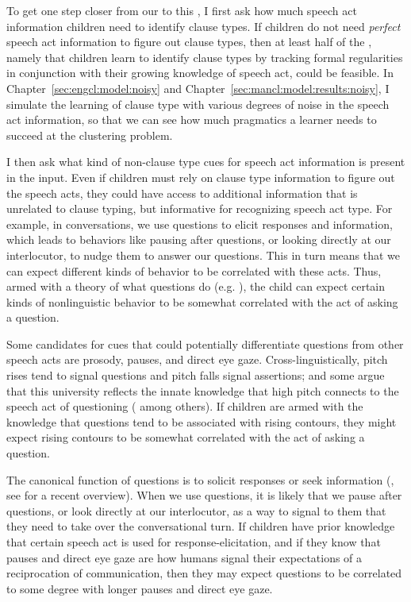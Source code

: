 To get one step closer from our \subhypos{} to this \tbf{\hypos{}}, I first ask how much speech act information children need to identify clause types. If children do not need \emph{perfect} speech act information to figure out clause types, then at least half of the \hypos{}, namely that children learn to identify clause types by tracking formal regularities in conjunction with their growing
knowledge of speech act, could be feasible. 
In Chapter~\ref{sec:engcl:model:noisy} and Chapter~\ref{sec:mancl:model:results:noisy}, I simulate the learning of clause type with various degrees of noise in the speech act information, so that we can see how much pragmatics a learner needs to succeed at the clustering problem. 

I then %
ask what kind of non-clause type cues for speech act information is present in the input. Even if children must rely on clause type information to figure out the speech acts, they could have access to additional information that is unrelated to clause typing, but informative for recognizing speech act type. For example, in conversations, we use questions to elicit responses and information, which leads to behaviors like pausing after questions, or looking directly at our interlocutor, to nudge them to answer our questions. 
This in turn means that we can expect different kinds of behavior to be correlated with these acts. Thus, armed with a theory of what questions do (e.g. \cite{carruthers2018q}), the child can expect certain kinds of nonlinguistic behavior to be somewhat correlated with the act of asking a question. 

Some candidates for cues that could potentially differentiate questions from other speech acts are prosody, pauses, and direct eye gaze. Cross-linguistically, pitch rises tend to signal questions and pitch falls signal assertions; and some argue that this university reflects the innate knowledge that high pitch connects to the speech act of questioning (\cite{ohala1984,gussenhovenchen2000,gussenhoven2002} among others). If children are armed with the knowledge that questions tend to be associated with rising contours, they might expect rising contours to be somewhat correlated with the act of asking a question. 

The canonical function of questions is to solicit responses or seek information (\citealt{searle1975tax,levinson1983,stivers2010}, see \citealt{krifka2011q} for a recent overview). When we use questions, it is likely that we pause after questions, or look directly at our interlocutor, as a way to signal to them that they need to take over the conversational turn. If children have prior knowledge that certain speech act is used for response-elicitation, and if they know that pauses and direct eye gaze are how humans signal their expectations of a reciprocation of communication, then they may expect questions to be correlated to some degree with longer pauses and direct eye gaze.

